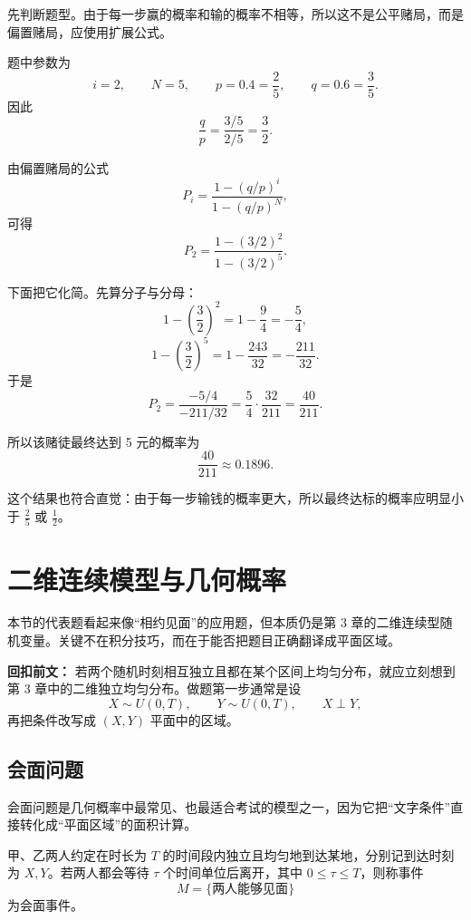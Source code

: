 ﻿\documentclass[lang=cn,11pt]{elegantbook}
\begin{document}
\begin{solution}
先判断题型。由于每一步赢的概率和输的概率不相等，所以这不是公平赌局，而是偏置赌局，应使用扩展公式。

题中参数为
\[
i=2,\qquad N=5,\qquad p=0.4=\frac25,\qquad q=0.6=\frac35.
\]
因此
\[
\frac{q}{p}=\frac{3/5}{2/5}=\frac32.
\]

由偏置赌局的公式
\[
P_i=\frac{1-(q/p)^i}{1-(q/p)^N},
\]
可得
\[
P_2=\frac{1-(3/2)^2}{1-(3/2)^5}.
\]

下面把它化简。先算分子与分母：
\[
1-\left(\frac32\right)^2=1-\frac94=-\frac54,
\]
\[
1-\left(\frac32\right)^5=1-\frac{243}{32}=-\frac{211}{32}.
\]
于是
\[
P_2=\frac{-5/4}{-211/32}
=\frac{5}{4}\cdot\frac{32}{211}
=\frac{40}{211}.
\]

所以该赌徒最终达到 5 元的概率为
\[
\frac{40}{211}\approx0.1896.
\]

这个结果也符合直觉：由于每一步输钱的概率更大，所以最终达标的概率应明显小于 \(\frac25\) 或 \(\frac12\)。
\end{solution}

\section{二维连续模型与几何概率}

本节的代表题看起来像“相约见面”的应用题，但本质仍是第 3 章的二维连续型随机变量。关键不在积分技巧，而在于能否把题目正确翻译成平面区域。

\begin{note}
\textbf{回扣前文：} 若两个随机时刻相互独立且都在某个区间上均匀分布，就应立刻想到第 3 章中的二维独立均匀分布。做题第一步通常是设
\[
X\sim U(0,T),\qquad Y\sim U(0,T),\qquad X\perp Y,
\]
再把条件改写成 \((X,Y)\) 平面中的区域。
\end{note}

\subsection{会面问题}

会面问题是几何概率中最常见、也最适合考试的模型之一，因为它把“文字条件”直接转化成“平面区域”的面积计算。

\begin{definition}[会面模型]\label{def:meeting-model}
甲、乙两人约定在时长为 \(T\) 的时间段内独立且均匀地到达某地，分别记到达时刻为 \(X,Y\)。若两人都会等待 \(\tau\) 个时间单位后离开，其中 \(0\le \tau\le T\)，则称事件
\[
M=\{\text{两人能够见面}\}
\]
为会面事件。
\end{definition}
\end{document}
